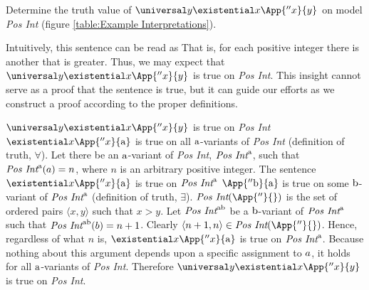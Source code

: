 \begin{majorILnc}{}
Determine the truth value of $\universal\variable{y}\existential\variable{x}\App{''\variable{x}}{\variable{y}}$ on model \emph{Pos Int} (figure \ref{table:Example Interpretations}).
\end{majorILnc}
\begin{commentary}
	Intuitively, this sentence can be read as 
	That is, for each positive integer there is another that is greater.
	Thus, we may expect that $\universal\variable{y}\existential\variable{x}\App{''\variable{x}}{\variable{y}}$ is true on \emph{Pos Int}.
	This insight cannot serve as a proof that the sentence is true, but it can guide our efforts as we construct a proof according to the proper definitions.
\end{commentary}
\begin{PROOF}
	$\universal\variable{y}\existential\variable{x}\App{''\variable{x}}{\variable{y}}$ is true on \emph{Pos Int} \Iff $\existential\variable{x}\App{''\variable{x}}{\constant{a}}$ is true on all $\mathrm{a}$-variants of \emph{Pos Int} (definition of truth, $\forall$). 
	Let there be an $\mathrm{a}$-variant of \emph{Pos Int}, $\emph{Pos Int}^{\mathrm{a}}$, such that $\emph{Pos Int}^{\mathrm{a}}(a)=n$, where $n$ is an arbitrary positive integer.
	The sentence $\existential\variable{x}\App{''\variable{x}}{\constant{a}}$ is true on $\emph{Pos Int}^{\mathrm{a}}$ \Iff $\App{''\constant{b}}{\constant{a}}$ is true on some $\mathrm{b}$-variant of $\emph{Pos Int}^{\mathrm{a}}$ (definition of truth, $\exists$).
	$\emph{Pos Int}(\App{''}{})$ is the set of ordered pairs $\langle x, y \rangle$ such that $x>y$.
	Let $\emph{Pos Int}^{\mathrm{a}\mathrm{b}}$ be a $\mathrm{b}$-variant of $\emph{Pos Int}^{\mathrm{a}}$ such that $\emph{Pos Int}^{\mathrm{a}\mathrm{b}}(b)=n+1$.
	Clearly $\langle n+1, n \rangle\in\emph{Pos Int}(\App{''}{})$.
	Hence, regardless of what $n$ is, $\existential\variable{x}\App{''\variable{x}}{\constant{a}}$ is true on $\emph{Pos Int}^{\mathrm{a}}$.
	Because nothing about this argument depends upon a specific assignment to $a$, it holds for all $\mathrm{a}$-variants of \emph{Pos Int}. 
	Therefore $\universal\variable{y}\existential\variable{x}\App{''\variable{x}}{\variable{y}}$ is true on \emph{Pos Int}.
\end{PROOF}

